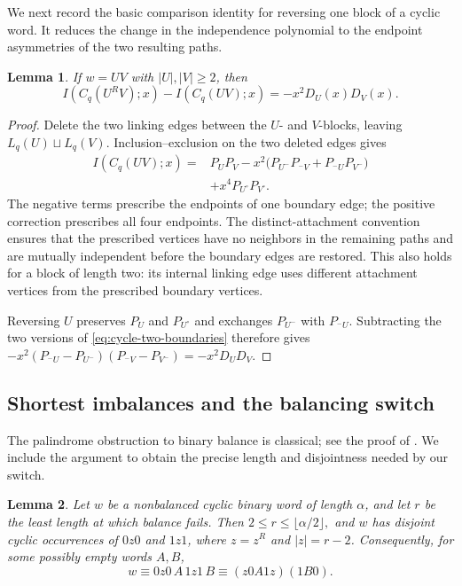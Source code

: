 \documentclass[11pt]{article}
\newtheorem{lemma}[lemma]{Lemma}
\theoremstyle{definition}
\begin{document}
We next record the basic comparison identity for reversing one block
of a cyclic word. It reduces the change in the independence polynomial
to the endpoint asymmetries of the two resulting paths.
\begin{lemma}\label{lem:block-reversal}
If $w=UV$ with $|U|,|V|\ge2$, then
\begin{equation}\label{eq:block-reversal}
 I(C_q(U^RV);x)-I(C_q(UV);x)=-x^2D_U(x)D_V(x).
\end{equation}
\end{lemma}

\begin{proof}
Delete the two linking edges between the $U$- and $V$-blocks, leaving
$L_q(U)\sqcup L_q(V)$. Inclusion--exclusion on the two deleted edges
gives
\begin{equation}\label{eq:cycle-two-boundaries}
 \begin{aligned}
 I(C_q(UV);x)
 ={}&P_UP_V-x^2\bigl(P_{U^-}P_{{}^-V}+P_{{}^-U}P_{V^-}\bigr)\\
 &+x^4P_{U^\circ}P_{V^\circ}.
 \end{aligned}
\end{equation}
The negative terms prescribe the endpoints of one boundary edge;
the positive correction prescribes all four endpoints. The
distinct-attachment convention ensures that the prescribed vertices
have no neighbors in the remaining paths and are mutually independent
before the boundary edges are restored. This also holds for a block
of length two: its internal linking edge uses different attachment
vertices from the prescribed boundary vertices.

Reversing $U$ preserves $P_U$ and $P_{U^\circ}$ and exchanges
$P_{U^-}$ with $P_{{}^-U}$. Subtracting the two versions of
\eqref{eq:cycle-two-boundaries} therefore gives
$-x^2(P_{{}^-U}-P_{U^-})(P_{{}^-V}-P_{V^-})=-x^2D_UD_V$.
\end{proof}


\subsection{Shortest imbalances and the balancing switch}

The palindrome obstruction to binary balance is classical; see the
proof of \cite[Proposition~4.4]{DeLucaZamboni2021}. We include the
argument to obtain the precise length and disjointness needed by our
switch.

\begin{lemma}\label{lem:first-imbalance}
Let $w$ be a nonbalanced cyclic binary word of length $\alpha$, and
let $r$ be the least length at which balance fails. Then
$
2\le r\le\lfloor\alpha/2\rfloor,
$
and $w$ has disjoint cyclic occurrences of $0z0$ and $1z1$, where
$z=z^R$ and $|z|=r-2$. Consequently, for some possibly empty words
$A,B$,
\begin{equation}\label{eq:obstruction-decomposition}
w\equiv 0z0\,A\,1z1\,B\equiv (z0A1z)(1B0).
\end{equation}
\end{lemma}
\end{document}
